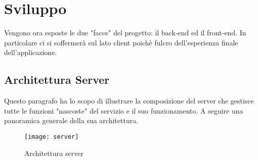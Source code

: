 \chapter{Sviluppo}
Vengono ora esposte le due "facce" del progetto: il back-end ed il front-end. In particolare ci si soffermerà sul lato client poichè fulcro dell'esperienza finale dell'applicazione.

\section{Architettura Server}
Questo paragrafo ha lo scopo di illustrare la composizione del server che gestisce tutte le funzioni "nascoste" del servizio e il suo funzionamento. A seguire una panoramica generale della sua architettura.

\begin{figure}[!h]
  \centering
    \texttt{[image: server]}
  \caption{Architettura server}
  \label{fig:server}
\end{figure}
\FloatBarrier

